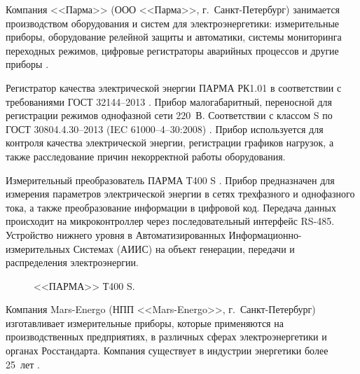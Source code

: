 Компания <<Парма>> (ООО <<Парма>>, г.~Санкт-Петербург) занимается производством оборудования и систем для электроэнергетики: измерительные приборы, оборудование релейной защиты и автоматики, системы мониторинга переходных режимов, цифровые регистраторы аварийных процессов и другие приборы \cite{parma}. 

Регистратор качества электрической энергии ПАРМА РК1.01 \cite{parma2} в соответствии с требованиями ГОСТ 32144–2013 \cite{GOST32144-2013}. 
Прибор малогабаритный, переносной для регистрации режимов однофазной сети $220$~В. Соответствии с классом S по ГОСТ 30804.4.30–2013 (IEC 61000–4–30:2008) \cite{GOST30804.4.30-2013}. Прибор используется для контроля качества электрической энергии, регистрации графиков нагрузок, а также расследование причин некорректной работы оборудования.
	
Измерительный преобразователь ПАРМА Т400 S \cite{parma1}.
Прибор предназначен для измерения параметров электрической энергии в сетях трехфазного и однофазного тока, а также преобразование информации в цифровой код. Передача данных происходит на микроконтроллер через последовательный интерфейс RS-485. Устройство нижнего уровня в Автоматизированных Информационно-измерительных Системах (АИИС) на объект генерации, передачи и распределения электроэнергии.

\begin{figure}[ht]
	\caption{<<ПАРМА>> Т400 S.}\label{fig:picture9}
\end{figure}

Компания Mars-Energo (НПП <<Mars-Energo>>, г.~Санкт-Петербург) изготавливает измерительные приборы, которые применяются на производственных предприятиях, в различных сферах электроэнергетики и органах Росстандарта. Компания существует в индустрии энергетики более 25~лет \cite{Mars-Energo}.

